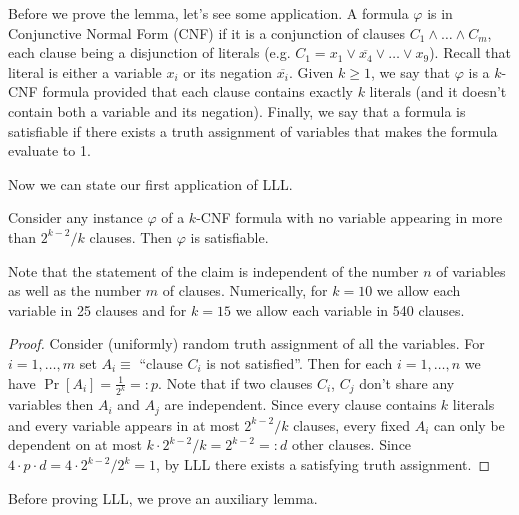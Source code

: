 Before we prove the lemma, let's see some application.
A formula $\varphi$ is in Conjunctive Normal Form (CNF) if it is a conjunction of clauses $C_1\wedge \dots\wedge C_m$, each clause being a disjunction of literals (e.g. $C_1=x_1\vee \overline{x_4}\vee\dots\vee x_9$). Recall that literal is either a variable $x_i$ or its negation $\overline{x_i}$. Given $k\geq 1$, we say that $\varphi$ is a $k$-CNF formula provided that each clause contains exactly $k$ literals (and it doesn't contain both a variable and its negation). Finally, we say that a formula is satisfiable if there exists a truth assignment of variables that makes the formula evaluate to 1.

Now we can state our first application of LLL.

\begin{claim} Consider any instance $\varphi$ of a $k$-CNF formula with no variable appearing in more than $2^{k-2}/k$ clauses. Then $\varphi$ is satisfiable. 
\end{claim}
\begin{remark}
Note that the statement of the claim is independent of the number $n$ of variables as well as the number $m$ of clauses. Numerically, for $k=10$ we allow each variable in 25 clauses and for $k=15$ we allow each variable in 540 clauses.
\end{remark}

\begin{proof} Consider (uniformly) random truth assignment of all the variables. For $i=1,\dots,m$ set $A_i\equiv$ ``clause $C_i$ is not satisfied''. Then for each $i=1,\dots,n$ we have $\Pr[A_i]=\frac1{2^k}=:p$. Note that if two clauses $C_i$, $C_j$ don't share any variables then $A_i$ and $A_j$ are independent. Since every clause contains $k$ literals and every variable appears in at most $2^{k-2}/k$ clauses, every fixed $A_i$ can only be dependent on at most $k\cdot 2^{k-2}/k=2^{k-2}=:d$ other clauses. Since $4\cdot p\cdot d=4\cdot 2^{k-2}/2^k=1$, by LLL there exists a satisfying truth assignment.
\end{proof}

Before proving LLL, we prove an auxiliary lemma.

